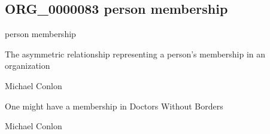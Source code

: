 \documentclass[letterpaper,10pt,english]{sphinxmanual}
\begin{document}
\subsection{ORG\_0000083 \sphinxhyphen{} person membership}
\label{\detokenize{doc-ORG_0000083:org-0000083-person-membership}}\label{\detokenize{doc-ORG_0000083:index-0}}\label{\detokenize{doc-ORG_0000083::doc}}
\begin{sphinxShadowBox}

\sphinxAtStartPar
person membership
\end{sphinxShadowBox}

\begin{sphinxShadowBox}

\sphinxAtStartPar
{\hyperref[\detokenize{doc-BFO_0000003::doc}]{}}
\end{sphinxShadowBox}

\begin{sphinxShadowBox}

\sphinxAtStartPar
The asymmetric relationship representing a person’s membership in an organization
\end{sphinxShadowBox}

\begin{sphinxShadowBox}

\sphinxAtStartPar
Michael Conlon 
\end{sphinxShadowBox}

\begin{sphinxShadowBox}

\sphinxAtStartPar
One might have a membership in Doctors Without Borders
\end{sphinxShadowBox}

\begin{sphinxShadowBox}

\sphinxAtStartPar
Michael Conlon 
\end{sphinxShadowBox}
\begin{quote}

\ignorespaces \end{quote}
\end{document}
